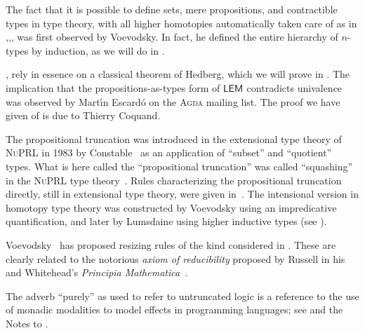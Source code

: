 \documentclass[12pt]{article}
\newcommand{\Agda}{\textsc{Agda}\xspace}
\newcommand{\LEM}[1]{\ensuremath{\mathsf{LEM}_{#1}}\xspace}
\newcommand{\NuPRL}{\textsc{NuPRL}\xspace}
\begin{document}
The fact that it is possible to define sets, mere propositions, and contractible types in type theory, with all higher homotopies automatically taken care of as in ,,, was first observed by Voevodsky.
In fact, he defined the entire hierarchy of $n$-types by induction, as we will do in .%

, rely in essence on a classical theorem of Hedberg,
%
%
which we will prove in .
The implication that the propositions-as-types form of \LEM{} contradicts univalence was observed by Mart\'\i n Escard\'o on the \Agda mailing list.
The proof we have given of  is due to Thierry Coquand.

The propositional truncation was introduced in the extensional type theory of
\index{proof!assistant!\NuPRL}%
\NuPRL in 1983 by Constable~\cite{Con85} as an
application of ``subset'' and ``quotient'' types.  What is here called the
``propositional truncation'' was called ``squashing'' in the \NuPRL type theory~\cite{constable+86nuprl-book}.
Rules characterizing the propositional truncation directly, still in extensional type theory, were given in~\cite{ab:bracket-types}.
The intensional version in homotopy type theory was constructed by Voevodsky using an impredicative quantification, and later by Lumsdaine using higher inductive types (see ).

%
Voevodsky~\cite{Universe-poly} has proposed resizing rules of the kind considered in .
%
These are clearly related to the notorious \emph{axiom of reducibility} proposed by Russell in his and Whitehead's \emph{Principia Mathematica}~\cite{PM2}.

The adverb ``purely'' as used to refer to untruncated logic is a reference to the use of monadic modalities to model effects in programming languages; see  and the Notes to .
\end{document}
